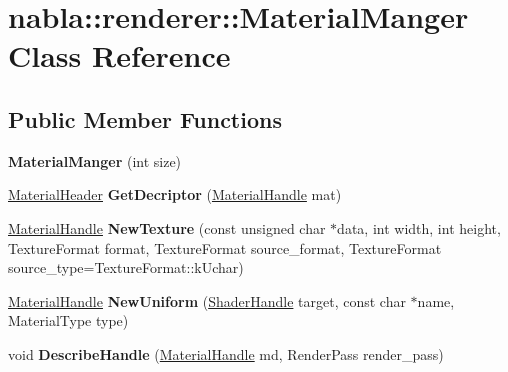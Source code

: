 \hypertarget{classnabla_1_1renderer_1_1_material_manger}{}\section{nabla\+::renderer\+::Material\+Manger Class Reference}
\label{classnabla_1_1renderer_1_1_material_manger}
\subsection*{Public Member Functions}
\begin{DoxyCompactItemize}
\item 
\mbox{\label{classnabla_1_1renderer_1_1_material_manger_a863ece945a81b98737a3c7557aeb08ae}} 
{\bfseries Material\+Manger} (int size)
\item 
\mbox{\label{classnabla_1_1renderer_1_1_material_manger_aaad74fed1217ceed0e37018f2c40f88b}} 
\mbox{\hyperlink{structnabla_1_1renderer_1_1_material_header}{Material\+Header}} {\bfseries Get\+Decriptor} (\mbox{\hyperlink{classnabla_1_1renderer_1_1_handle}{Material\+Handle}} mat)
\item 
\mbox{\label{classnabla_1_1renderer_1_1_material_manger_a5aef2c60df3b026aa73f1a9df0a9bf37}} 
\mbox{\hyperlink{classnabla_1_1renderer_1_1_handle}{Material\+Handle}} {\bfseries New\+Texture} (const unsigned char $\ast$data, int width, int height, Texture\+Format format, Texture\+Format source\+\_\+format, Texture\+Format source\+\_\+type=Texture\+Format\+::k\+Uchar)
\item 
\mbox{\label{classnabla_1_1renderer_1_1_material_manger_aebd9d824ef57e845f89b8b84f67730e1}} 
\mbox{\hyperlink{classnabla_1_1renderer_1_1_handle}{Material\+Handle}} {\bfseries New\+Uniform} (\mbox{\hyperlink{classnabla_1_1renderer_1_1_handle}{Shader\+Handle}} target, const char $\ast$name, Material\+Type type)
\item 
\mbox{\label{classnabla_1_1renderer_1_1_material_manger_a6d820e92c20c5ca97ca5850859a39f73}} 
void {\bfseries Describe\+Handle} (\mbox{\hyperlink{classnabla_1_1renderer_1_1_handle}{Material\+Handle}} md, Render\+Pass render\+\_\+pass)

\end{DoxyCompactItemize}
